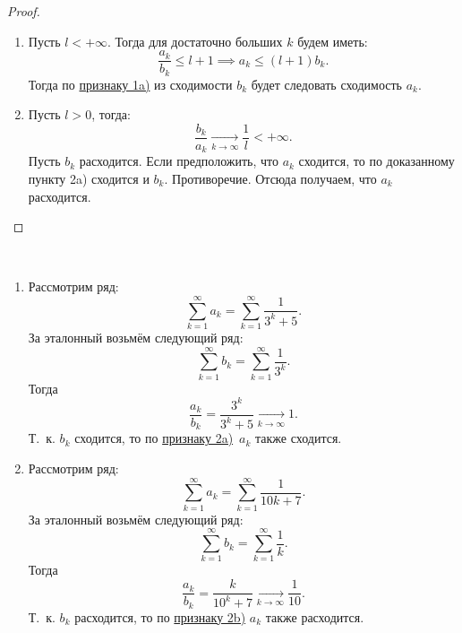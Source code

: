 \documentclass[../../main.tex]{subfiles}
\begin{document}
 \begin{proof}
 
 ~
 
	\begin{enumerate}[label={\alph*)}]
	\item Пусть $l< +\infty$.
	Тогда для достаточно больших $k$ будем иметь:
	 \[
	 	\frac{a_k}{b_k} \leq l + 1  \implies a_k \leq (l+1)b_k
	 .\]
	Тогда по \hyperref[lec26:comp_test_1]{признаку  1\textdegree a)} из 
	 сходимости $b_k$ будет следовать сходимость $a_k$.
	\item Пусть $l > 0$, тогда:
	\[
	\frac{b_k}{a_k} \xrightarrow[k \to \infty]{} \frac{1}{l} < +\infty
	.\]
	Пусть $b_k$ расходится. Если предположить,
	что $a_k$  сходится, то по доказанному пункту
	2\textdegree a) сходится и $b_k$. Противоречие.
	Отсюда получаем, что $a_k$ расходится. \qedhere
	\end{enumerate}
\end{proof}
\begin{examples}

~

\begin{enumerate}
\item
Рассмотрим ряд:
	\[
		 \sum\limits_{k = 1}^\infty a_k=  \sum\limits_{k = 1}^\infty\frac{1}{3^k + 5}
	.\]
	За эталонный возьмём следующий ряд:
	\[
		\sum\limits_{k = 1}^\infty b_k=   \sum\limits_{k = 1}^\infty\frac{1}{3^k}
	.\]
	Тогда \[\frac{a_k}{b_k} = \frac{3^k}{3^k + 5} \xrightarrow[k \to \infty]{} 1.\]
	Т.~к. $b_k$ сходится, то по  
	 \hyperref[lec26:comp_test_2]{признаку  2\textdegree a)}\ $a_k$ также 
	 сходится.
\item
	Рассмотрим ряд:
	\[
		 \sum\limits_{k = 1}^\infty a_k=  \sum\limits_{k = 1}^\infty\frac{1}{10k + 7}
	.\]
	За эталонный возьмём следующий ряд:
	\[
		\sum\limits_{k = 1}^\infty b_k=   \sum\limits_{k = 1}^\infty\frac{1}{k}
	.\]
	Тогда \[\frac{a_k}{b_k} = \frac{k}{10^k + 7} \xrightarrow[k \to \infty]{} 
	\frac{1}{10}.\] 
	Т.~к. $b_k$ расходится, то по  
	 \hyperref[lec26:comp_test_2]{признаку  2\textdegree b)}
	 $a_k$ также расходится.
\end{enumerate}
\end{examples}
\end{document}

